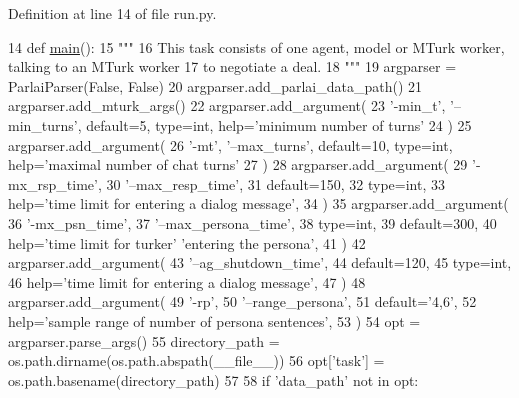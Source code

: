 Definition at line 14 of file run.\+py.


\begin{DoxyCode}
14 \textcolor{keyword}{def }\hyperlink{namespaceprojects_1_1wizard__of__wikipedia_1_1mturk__evaluation__task_1_1run_ad3ab2c71f8083c3112815c0b363d316b}{main}():
15     \textcolor{stringliteral}{"""}
16 \textcolor{stringliteral}{    This task consists of one agent, model or MTurk worker, talking to an MTurk worker}
17 \textcolor{stringliteral}{    to negotiate a deal.}
18 \textcolor{stringliteral}{    """}
19     argparser = ParlaiParser(\textcolor{keyword}{False}, \textcolor{keyword}{False})
20     argparser.add\_parlai\_data\_path()
21     argparser.add\_mturk\_args()
22     argparser.add\_argument(
23         \textcolor{stringliteral}{'-min\_t'}, \textcolor{stringliteral}{'--min\_turns'}, default=5, type=int, help=\textcolor{stringliteral}{'minimum number of turns'}
24     )
25     argparser.add\_argument(
26         \textcolor{stringliteral}{'-mt'}, \textcolor{stringliteral}{'--max\_turns'}, default=10, type=int, help=\textcolor{stringliteral}{'maximal number of chat turns'}
27     )
28     argparser.add\_argument(
29         \textcolor{stringliteral}{'-mx\_rsp\_time'},
30         \textcolor{stringliteral}{'--max\_resp\_time'},
31         default=150,
32         type=int,
33         help=\textcolor{stringliteral}{'time limit for entering a dialog message'},
34     )
35     argparser.add\_argument(
36         \textcolor{stringliteral}{'-mx\_psn\_time'},
37         \textcolor{stringliteral}{'--max\_persona\_time'},
38         type=int,
39         default=300,
40         help=\textcolor{stringliteral}{'time limit for turker'} \textcolor{stringliteral}{'entering the persona'},
41     )
42     argparser.add\_argument(
43         \textcolor{stringliteral}{'--ag\_shutdown\_time'},
44         default=120,
45         type=int,
46         help=\textcolor{stringliteral}{'time limit for entering a dialog message'},
47     )
48     argparser.add\_argument(
49         \textcolor{stringliteral}{'-rp'},
50         \textcolor{stringliteral}{'--range\_persona'},
51         default=\textcolor{stringliteral}{'4,6'},
52         help=\textcolor{stringliteral}{'sample range of number of persona sentences'},
53     )
54     opt = argparser.parse\_args()
55     directory\_path = os.path.dirname(os.path.abspath(\_\_file\_\_))
56     opt[\textcolor{stringliteral}{'task'}] = os.path.basename(directory\_path)
57 
58     \textcolor{keywordflow}{if} \textcolor{stringliteral}{'data\_path'} \textcolor{keywordflow}{not} \textcolor{keywordflow}{in} opt:

\end{DoxyCode}
